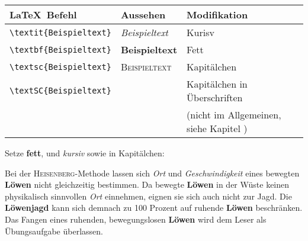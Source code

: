 \begin{frame}[fragile]
	\Befehle\vspace{0.1cm}
	\begin{center}
		\begin{tabular}{lll}
			\toprule
			\LaTeX\ Befehl						&	Aussehen				&	Modifikation	\\ \midrule
			\lstinline|\textit{Beispieltext}|	&	\textit{Beispieltext}	&	Kurisv			\\
			\lstinline|\textbf{Beispieltext}|	&	\textbf{Beispieltext}	&	Fett			\\
			\lstinline|\textsc{Beispieltext}|	&	\textsc{Beispieltext}	&	Kapitälchen 		\\
			\lstinline|\textSC{Beispieltext}|	&	\textSC{Beispieltext}	&	Kapitälchen in Überschriften		\\ 
			&		&	{\tiny (nicht im Allgemeinen, siehe Kapitel \qquote{Newcommand})}		\\   \bottomrule
		\end{tabular}
	\end{center}
	\btVFill
	\Aufgabee
	Setze  \textbf{fett},  und  \textit{kursiv} sowie  in Kapitälchen:
	\begin{outputbox}
		Bei der \textsc{Heisenberg}-Methode lassen sich \textit{Ort} und \textit{Geschwindigkeit} eines bewegten \textbf{Löwen} nicht gleichzeitig bestimmen. Da bewegte \textbf{Löwen} in der Wüste keinen physikalisch sinnvollen \textit{Ort} einnehmen, eignen sie sich auch nicht zur Jagd. Die \textbf{Löwenjagd} kann sich demnach zu 100 Prozent auf ruhende \textbf{Löwen} beschränken. Das Fangen eines ruhenden, bewegungslosen \textbf{Löwen} wird dem Leser als Übungsaufgabe überlassen.
	\end{outputbox}
	\vspace{0.3cm}
\end{frame}
